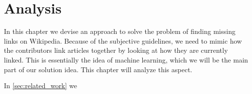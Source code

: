 \chapter{Analysis}\label{chap:analysis}
In this chapter we devise an approach to solve the problem of finding missing links on Wikipedia. 
Because of the subjective guidelines, we need to mimic how the contributors link articles together by looking at how they are currently linked. This is essentially the idea of machine learning, which we will be the main part of our solution idea. This chapter will analyze this aspect.

\begin{chapterorganization}
  \item In \cref{sec:related_work} we
\end{chapterorganization}






